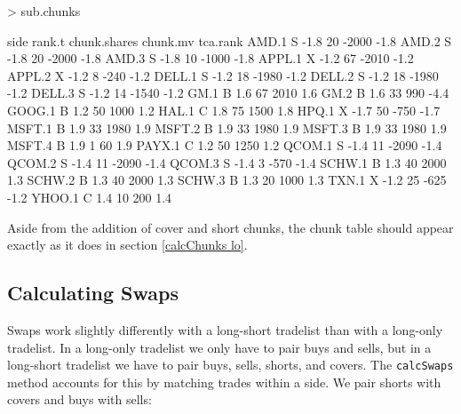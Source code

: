 \documentclass{article}
\begin{document}
\begin{Schunk}
\begin{Sinput}
> sub.chunks
\end{Sinput}
\begin{Soutput}
       side rank.t chunk.shares chunk.mv tca.rank
AMD.1     S   -1.8           20    -2000     -1.8
AMD.2     S   -1.8           20    -2000     -1.8
AMD.3     S   -1.8           10    -1000     -1.8
APPL.1    X   -1.2           67    -2010     -1.2
APPL.2    X   -1.2            8     -240     -1.2
DELL.1    S   -1.2           18    -1980     -1.2
DELL.2    S   -1.2           18    -1980     -1.2
DELL.3    S   -1.2           14    -1540     -1.2
GM.1      B    1.6           67     2010      1.6
GM.2      B    1.6           33      990     -4.4
GOOG.1    B    1.2           50     1000      1.2
HAL.1     C    1.8           75     1500      1.8
HPQ.1     X   -1.7           50     -750     -1.7
MSFT.1    B    1.9           33     1980      1.9
MSFT.2    B    1.9           33     1980      1.9
MSFT.3    B    1.9           33     1980      1.9
MSFT.4    B    1.9            1       60      1.9
PAYX.1    C    1.2           50     1250      1.2
QCOM.1    S   -1.4           11    -2090     -1.4
QCOM.2    S   -1.4           11    -2090     -1.4
QCOM.3    S   -1.4            3     -570     -1.4
SCHW.1    B    1.3           40     2000      1.3
SCHW.2    B    1.3           40     2000      1.3
SCHW.3    B    1.3           20     1000      1.3
TXN.1     X   -1.2           25     -625     -1.2
YHOO.1    C    1.4           10      200      1.4
\end{Soutput}
\end{Schunk}

Aside from the addition of cover and short chunks, the chunk table
should appear exactly as it does in section \ref{calcChunks lo}.


\subsection{Calculating Swaps}

Swaps work slightly differently with a long-short tradelist than with
a long-only tradelist.  In a long-only tradelist we only have to pair
buys and sells, but in a long-short tradelist we have to pair buys,
sells, shorts, and covers.  The \texttt{calcSwaps} method accounts for
this by matching trades within a side.  We pair shorts with covers and
buys with sells:
\end{document}
